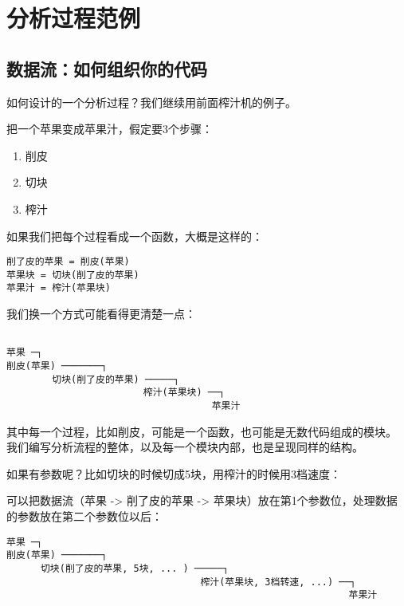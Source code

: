 \documentclass[
  letterpaper,
  DIV=11,
  numbers=noendperiod]{scrreprt}
\providecommand{\tightlist}{%
  \setlength{\itemsep}{0pt}\setlength{\parskip}{0pt}}\usepackage{longtable,booktabs,array}
\begin{document}
\hypertarget{ux5206ux6790ux8fc7ux7a0bux8303ux4f8b}{%
\chapter{分析过程范例}\label{ux5206ux6790ux8fc7ux7a0bux8303ux4f8b}}

\hypertarget{ux6570ux636eux6d41ux5982ux4f55ux7ec4ux7ec7ux4f60ux7684ux4ee3ux7801}{%
\section{数据流：如何组织你的代码}\label{ux6570ux636eux6d41ux5982ux4f55ux7ec4ux7ec7ux4f60ux7684ux4ee3ux7801}}

如何设计的一个分析过程？我们继续用前面榨汁机的例子。

把一个苹果变成苹果汁，假定要3个步骤：

\begin{enumerate}
\def\labelenumi{\arabic{enumi}.}
\tightlist
\item
  削皮
\item
  切块
\item
  榨汁
\end{enumerate}

如果我们把每个过程看成一个函数，大概是这样的：

\begin{verbatim}
削了皮的苹果 = 削皮(苹果) 
苹果块 = 切块(削了皮的苹果) 
苹果汁 = 榨汁(苹果块) 
\end{verbatim}

我们换一个方式可能看得更清楚一点：

\begin{verbatim}

苹果 ─┐
削皮(苹果) ───────┐
        切块(削了皮的苹果) ─────┐
                        榨汁(苹果块) ──┐ 
                                    苹果汁
\end{verbatim}

其中每一个过程，比如削皮，可能是一个函数，也可能是无数代码组成的模块。
我们编写分析流程的整体，以及每一个模块内部，也是呈现同样的结构。

如果有参数呢？比如切块的时候切成5块，用榨汁的时候用3档速度：

可以把数据流（苹果 -\textgreater{} 削了皮的苹果 -\textgreater{}
苹果块）放在第1个参数位，处理数据的参数放在第二个参数位以后：

\begin{verbatim}
苹果 ─┐
削皮(苹果) ───────┐
      切块(削了皮的苹果, 5块, ... ) ─────┐
                                  榨汁(苹果块, 3档转速, ...) ──┐ 
                                                            苹果汁
\end{verbatim}
\end{document}
